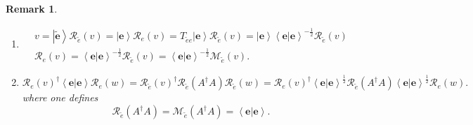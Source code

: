 \documentclass[aps,preprint]{revtex4}%
\newtheorem{remark}[theorem]{Remark}
\begin{document}
\begin{remark}
\begin{enumerate}
\begin{enumerate}
\item
\begin{gather}
v=\left\vert \widetilde{\mathbf{e}}\right\rangle \mathcal{R}_{\widetilde{e}%
}\left(  v\right)  =\left\vert \mathbf{e}\right\rangle \mathcal{R}_{e}\left(
v\right)  =T_{\widetilde{e}e}\left\vert \mathbf{e}\right\rangle \mathcal{R}%
_{\widetilde{e}}\left(  v\right)  =\left\vert \mathbf{e}\right\rangle
\left\langle \left.  \mathbf{e}\right\vert \mathbf{e}\right\rangle ^{-\frac
{1}{2}}\mathcal{R}_{\widetilde{e}}\left(  v\right) \\
\mathcal{R}_{e}\left(  v\right)  =\left\langle \left.  \mathbf{e}\right\vert
\mathbf{e}\right\rangle ^{-\frac{1}{2}}\mathcal{R}_{\widetilde{e}}\left(
v\right)  =\left\langle \left.  \mathbf{e}\right\vert \mathbf{e}\right\rangle
^{-\frac{1}{2}}\mathcal{M}_{\widetilde{e}}\left(  v\right)  .
\end{gather}


\item
\begin{equation}
\mathcal{R}_{e}\left(  v\right)  ^{\dagger}\left\langle \left.  \mathbf{e}%
\right\vert \mathbf{e}\right\rangle \mathcal{R}_{e}\left(  w\right)
=\mathcal{R}_{\widetilde{e}}\left(  v\right)  ^{\dagger}\mathcal{R}%
_{\widetilde{e}}\left(  A^{\dagger}A\right)  \mathcal{R}_{\widetilde{e}%
}\left(  w\right)  =\mathcal{R}_{e}\left(  v\right)  ^{\dagger}\left\langle
\left.  \mathbf{e}\right\vert \mathbf{e}\right\rangle ^{\frac{1}{2}%
}\mathcal{R}_{\widetilde{e}}\left(  A^{\dagger}A\right)  \left\langle \left.
\mathbf{e}\right\vert \mathbf{e}\right\rangle ^{\frac{1}{2}}\mathcal{R}%
_{e}\left(  w\right)  .
\end{equation}
where one \emph{defines}
\begin{equation}
\mathcal{R}_{\widetilde{e}}\left(  A^{\dagger}A\right)  =\mathcal{M}%
_{\widetilde{e}}\left(  A^{\dagger}A\right)  =\left\langle \left.
\mathbf{e}\right\vert \mathbf{e}\right\rangle .
\end{equation}



\end{enumerate}
\end{enumerate}
\end{remark}
\end{document}
